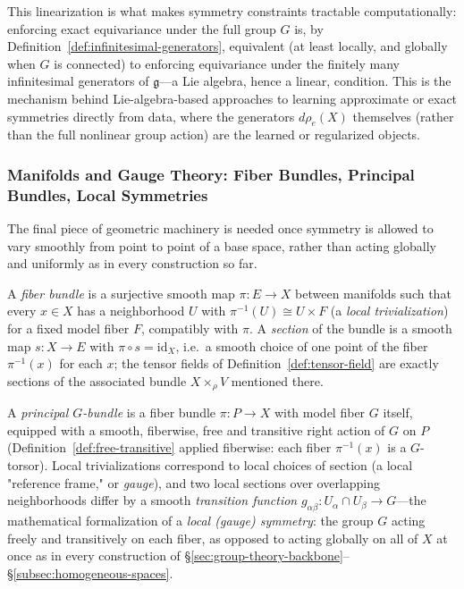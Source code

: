 \documentclass[mathematics,review,submit,moreauthors]{Definitions/mdpi}
\begin{document}
This linearization is what makes symmetry constraints tractable
computationally: enforcing exact equivariance under the full group $G$ is,
by Definition~\ref{def:infinitesimal-generators}, equivalent (at least
locally, and globally when $G$ is connected) to enforcing equivariance under
the finitely many infinitesimal generators of $\mathfrak{g}$---a Lie
algebra, hence a linear, condition. This is the mechanism behind
Lie-algebra-based approaches to learning approximate or exact symmetries
directly from data, where the generators $d\rho_e(X)$ themselves (rather
than the full nonlinear group action) are the learned or regularized
objects.

\subsubsection{Manifolds and Gauge Theory: Fiber Bundles, Principal Bundles, Local Symmetries}
\label{subsec:manifold-gauge-theory}

The final piece of geometric machinery is needed once symmetry is allowed to
vary smoothly from point to point of a base space, rather than acting
globally and uniformly as in every construction so far.

\begin{Definition}
\label{def:fiber-bundle}
A \emph{fiber bundle} is a surjective smooth map $\pi : E \to X$ between
manifolds such that every $x \in X$ has a neighborhood $U$ with
$\pi^{-1}(U) \cong U \times F$ (a \emph{local trivialization}) for a fixed
model fiber $F$, compatibly with $\pi$. A \emph{section} of the bundle is a
smooth map $s : X \to E$ with $\pi \circ s = \mathrm{id}_X$, i.e.\ a smooth
choice of one point of the fiber $\pi^{-1}(x)$ for each $x$; the tensor
fields of Definition~\ref{def:tensor-field} are exactly sections of the
associated bundle $X \times_\rho V$ mentioned there.
\end{Definition}

\begin{Definition}
\label{def:principal-bundle}
A \emph{principal $G$-bundle} is a fiber bundle $\pi : P \to X$ with model
fiber $G$ itself, equipped with a smooth, fiberwise, free and transitive
right action of $G$ on $P$ (Definition~\ref{def:free-transitive} applied
fiberwise: each fiber $\pi^{-1}(x)$ is a $G$-torsor). Local
trivializations correspond to local choices of section (a local "reference
frame," or \emph{gauge}), and two local sections over overlapping
neighborhoods differ by a smooth \emph{transition function} $g_{\alpha\beta}
: U_\alpha \cap U_\beta \to G$---the mathematical formalization of a
\emph{local (gauge) symmetry}: the group $G$ acting freely and transitively
on each fiber, as opposed to acting globally on all of $X$ at once as in
every construction of \S\ref{sec:group-theory-backbone}--\S\ref{subsec:homogeneous-spaces}.
\end{Definition}
\end{document}
